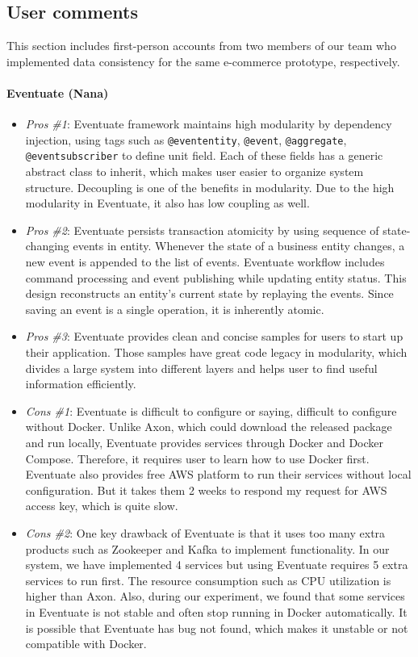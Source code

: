 \subsection{User comments}

This section includes first-person accounts from two members of our team who implemented data consistency for the same e-commerce prototype, respectively.

\paragraph{Eventuate (Nana)}

\begin{itemize}
    \item \textit{Pros \#1}: Eventuate framework maintains high modularity by dependency injection, using tags such as \texttt{@even\-tentity}, \texttt{@event}, \texttt{@aggregate}, \texttt{@eventsubscriber} to define unit field. Each of these fields has a generic abstract class to inherit, which makes user easier to organize system structure. Decoupling is one of the benefits in modularity. Due to the high modularity in Eventuate, it also has low coupling as well.
    \item \textit{Pros \#2}: Eventuate persists transaction atomicity by using sequence of state-changing events in entity. Whenever the state of a business entity changes, a new event is appended to the list of events. Eventuate workflow includes command processing and event publishing while updating entity status. This design reconstructs an entity’s current state by replaying the events. Since saving an event is a single operation, it is inherently atomic.
    \item \textit{Pros \#3}: Eventuate provides clean and concise samples for users to start up their application. Those samples have great code legacy in modularity, which divides a large system into different layers and helps user to find useful information efficiently.
    \item \textit{Cons \#1}: Eventuate is difficult to configure or saying, difficult to configure without Docker. Unlike Axon, which could download the released package and run locally, Eventuate provides services through Docker and Docker Compose. Therefore, it requires user to learn how to use Docker first. Eventuate also provides free AWS platform to run their services without local configuration. But it takes them 2 weeks to respond my request for AWS access key, which is quite slow.
    \item \textit{Cons \#2}: One key drawback of Eventuate is that it uses too many extra products such as Zookeeper and Kafka to implement functionality. In our system, we have implemented 4 services but using Eventuate requires 5 extra services to run first. The resource consumption such as CPU utilization is higher than Axon. Also, during our experiment, we found that some services in Eventuate is not stable and often stop running in Docker automatically. It is possible that Eventuate has bug not found, which makes it unstable or not compatible with Docker.

\end{itemize}
